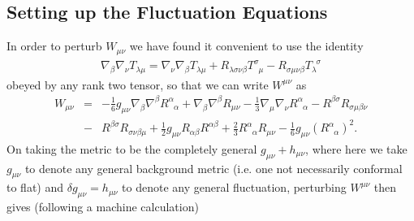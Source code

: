 \documentclass[aps]{revtex4}
\begin{document}
\subsection{Setting up the Fluctuation Equations}

In order to perturb $W_{\mu\nu}$ we have found it convenient to use the identity
%
\begin{eqnarray}
\nabla_{\beta}\nabla_{\nu}T_{\lambda \mu}=\nabla_{\nu}\nabla_{\beta}T_{\lambda \mu}+R_{\lambda\sigma\nu\beta}T^{\sigma}_{\phantom{\sigma}\mu}-R_{\sigma\mu\nu\beta}T_{\lambda}^{\phantom{\lambda}\sigma}
\label{AP41}
\end{eqnarray}
%
obeyed by any rank two tensor, so that we can write $W^{\mu\nu}$ as 
%                                                                               
\begin{eqnarray}
W_{\mu \nu}&=&
-\frac{1}{6}g_{\mu\nu}\nabla_{\beta}\nabla^{\beta}R^{\alpha}_{\phantom{\alpha}\alpha}
+\nabla_{\beta}\nabla^{\beta}R_{\mu\nu}                    
 -\frac{1}{3}\nabla_{\mu}\nabla_{\nu}R^{\alpha}_{\phantom{\alpha}\alpha}  
 -R^{\beta\sigma} R_{\sigma\mu\beta\nu}   
  \nonumber\\
 &-&R^{\beta\sigma} R_{\sigma\nu\beta\mu}  
+\frac{1}{2}g_{\mu\nu}R_{\alpha\beta}R^{\alpha\beta}                                            
+\frac{2}{3}R^{\alpha}_{\phantom{\alpha}\alpha}R_{\mu\nu}                              
-\frac{1}{6}g_{\mu\nu}(R^{\alpha}_{\phantom{\alpha}\alpha})^2.
\label{AP42}
\end{eqnarray}                                 
%
On taking the metric to be the completely general $g_{\mu\nu}+h_{\mu\nu}$, where here we take $g_{\mu\nu}$ to denote any general background metric (i.e. one not necessarily conformal to flat) and $\delta g_{\mu\nu}=h_{\mu\nu}$ to denote any general fluctuation, perturbing $W^{\mu\nu}$ then gives (following a machine calculation)
%
\end{document}

